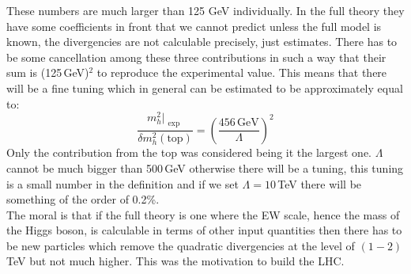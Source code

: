 \documentclass[../main.tex]{subfiles}
\begin{document}
These numbers are much larger than 125 GeV individually. In the full theory they have some coefficients in front that we cannot predict unless the full model is known, the divergencies are not calculable precisely, just estimates. There has to be some cancellation among these three contributions in such a way that their sum is (125\,GeV)$^2$ to reproduce the experimental value. This means that there will be a fine tuning which in general can be estimated to be approximately equal to:
\[
\frac{m_h^2\Bigr|_{\substack{\text{exp}}}}{\delta m_h^2(\text{top})}=\left(\frac{456\,\text{GeV}}{\Lambda}\right)^2
\]
Only the contribution from the top was considered being it the largest one. $\Lambda$ cannot be much bigger than 500\,GeV otherwise there will be a tuning, this tuning is a small number in the definition and if we set $\Lambda=10$\,TeV there will be something of the order of 0.2\%.\\
The moral is that if the full theory is one where the EW scale, hence the mass of the Higgs boson, is calculable in terms of other input quantities then there has to be new particles which remove the quadratic divergencies at the level of $(1-2)$\,TeV but not much higher. This was the motivation to build the LHC.
\end{document}

